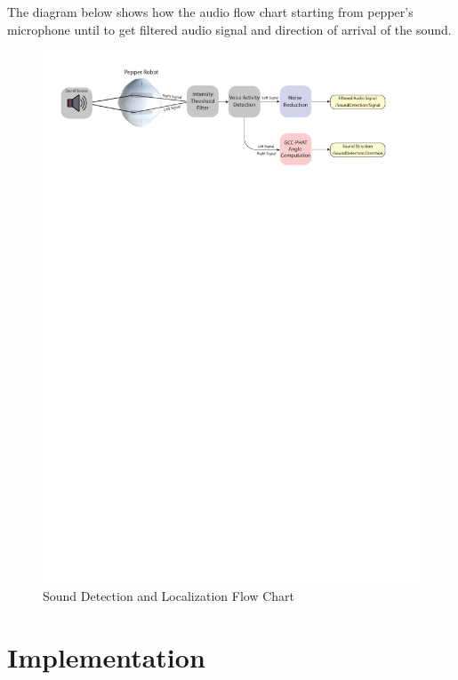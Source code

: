 \documentclass{CSSRforAfrica}
\begin{document}
\newpage

The diagram below shows how the audio flow chart starting from pepper's microphone until to get filtered audio signal and direction of arrival of the sound.

\begin{figure}[!hbpt]
	\centering
	\includegraphics[scale=0.78]{images/Sound_Diagram.pdf}
	\caption{Sound Detection and Localization Flow Chart}
	\label{fig:Sound_Diagram}
\end{figure}


\newpage

\section{Implementation}
\end{document}
